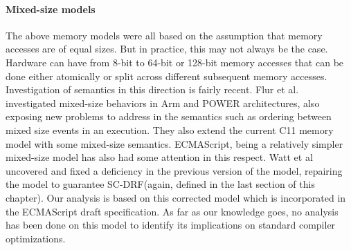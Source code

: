     \paragraph{Mixed-size models}
    The above memory models were all based on the assumption that memory accesses are of equal sizes. 
    But in practice, this may not always be the case. 
    Hardware can have from 8-bit to 64-bit or 128-bit memory accesses that can be done either atomically or split across different subsequent memory accesses. 
    Investigation of semantics in this direction is fairly recent.
    Flur et al.~\cite{Flur} investigated mixed-size behaviors in Arm and POWER architectures, also exposing new problems to address in the semantics such as ordering between mixed size events in an execution. 
    They also extend the current C11 memory model with some mixed-size semantics.
    ECMAScript, being a relatively simpler mixed-size model has also had some attention in this respect. 
    Watt et al~\cite{WattC} uncovered and fixed a deficiency in the previous version of the model, repairing the model to guarantee SC-DRF(again, defined in the last section of this chapter).
    Our analysis is based on this corrected model which is incorporated in the ECMAScript draft specification. 
    As far as our knowledge goes, no analysis has been done on this model to identify its implications on standard compiler optimizations. 



